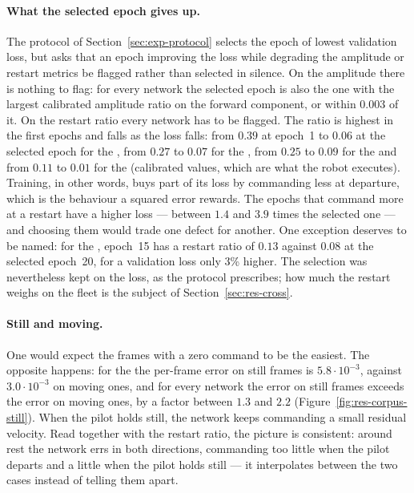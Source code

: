 \paragraph{What the selected epoch gives up.}
The protocol of Section~\ref{sec:exp-protocol} selects the epoch of lowest
validation loss, but asks that an epoch improving the loss while degrading the
amplitude or restart metrics be flagged rather than selected in silence. On the
amplitude there is nothing to flag: for every network the selected epoch is
also the one with the largest calibrated amplitude ratio on the forward
component, or within $0.003$ of it. On the restart ratio every network has to
be flagged. The ratio is highest in the first epochs and falls as the loss
falls: from $0.39$ at epoch~1 to $0.06$ at the selected epoch for the
, from $0.27$ to $0.07$ for the ,
from $0.25$ to $0.09$ for the  and from $0.11$ to
$0.01$ for the  (calibrated values, which are what the
robot executes). Training, in other words, buys part of its loss by commanding
less at departure, which is the behaviour a squared error rewards. The epochs
that command more at a restart have a higher loss --- between $1.4$ and $3.9$
times the selected one --- and choosing them would trade one defect for
another. One exception deserves to be named: for the
, epoch~15 has a restart ratio of $0.13$ against
$0.08$ at the selected epoch~20, for a validation loss only 3\% higher. The
selection was nevertheless kept on the loss, as the protocol prescribes; how
much the restart weighs on the fleet is the subject of
Section~\ref{sec:res-cross}.

\paragraph{Still and moving.}
One would expect the frames with a zero command to be the easiest. The opposite
happens: for the  the per-frame error on still frames
is $5.8\cdot10^{-3}$, against $3.0\cdot10^{-3}$ on moving ones, and for every
network the error on still frames exceeds the error on moving ones, by a factor
between $1.3$ and $2.2$ (Figure~\ref{fig:res-corpus-still}). When the pilot
holds still, the network keeps commanding a small residual velocity. Read
together with the restart ratio, the picture is consistent: around rest the
network errs in both directions, commanding too little when the pilot departs
and a little when the pilot holds still --- it interpolates between the two
cases instead of telling them apart.

